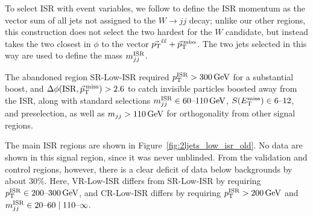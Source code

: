 To select ISR with event variables, we follow \cite{atlas_23l_SUSY_2016_24}
to define the ISR momentum as the vector sum of all jets not assigned to the
$W\to jj$ decay;
unlike our other regions, this construction does not select the two hardest for
the $W$ candidate, but instead takes the two closest in $\phi$ to the
vector $\vec \pt^{\ell\ell} + \ptmiss$.
The two jets selected in this way are used to define the mass $\mwisr$.

The abandoned region SR-Low-ISR required $\ptisr > 300\,\eV[G]$ for a
substantial boost, and $\dphiisrmet > 2.6$ to catch invisible particles boosted
away from the ISR,
along with standard selections $\mwisr \in 60\textrm{--}110\,\eV[G]$,
$\metsig \in 6\textrm{--}12$, and preselection, as well as $\mjj > 110\,\eV[G]$
for orthogonality from other signal regions.

The main ISR regions are shown in Figure~\ref{fig:2ljets_low_isr_old}.
No data are shown in this signal region, since it was never unblinded.
From the validation and control regions, however, there is a clear deficit
of data below backgrounds by about $30\%$.
Here, VR-Low-ISR differs from SR-Low-ISR by requiring
$\ptisr \in 200\textit{--}300\,\eV[G]$, and CR-Low-ISR differs by requiring
$\ptisr > 200\,\eV[G]$ and
$\mwisr \in 20\textrm{--}60 \mid 110\textrm{--}\infty$.

